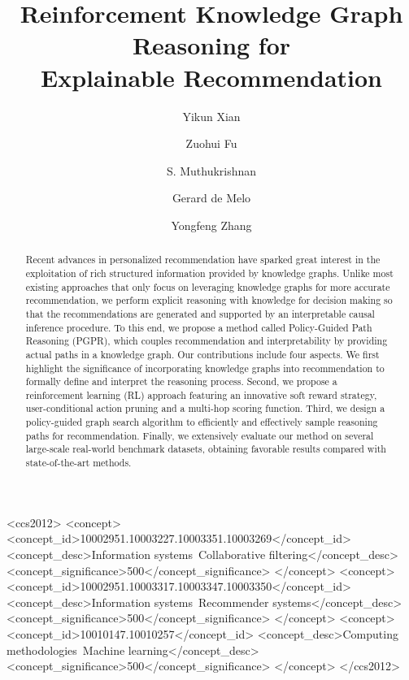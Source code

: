 \documentclass[sigconf]{acmart}
\begin{document}
\fancyhead{}

\title{Reinforcement Knowledge Graph Reasoning for \\ Explainable Recommendation}

\author{Yikun Xian}

\author{Zuohui Fu}
\authornotemark[1]

\author{S. Muthukrishnan}

\author{Gerard de Melo}

\author{Yongfeng Zhang}


\begin{abstract}
Recent advances in personalized recommendation have sparked great interest in the exploitation of rich structured information provided by knowledge graphs.
Unlike most existing approaches that only focus on leveraging knowledge graphs for more accurate recommendation, we perform explicit reasoning with knowledge for decision making so that the recommendations are generated and supported by an interpretable causal inference procedure.
To this end, we propose a method called Policy-Guided Path Reasoning (PGPR), which couples recommendation and interpretability by providing actual paths in a knowledge graph. Our contributions include four aspects. We first highlight the significance of incorporating knowledge graphs into recommendation to formally define and interpret the reasoning process. Second, we propose a reinforcement learning (RL) approach featuring an innovative soft reward strategy, user-conditional action pruning and a multi-hop scoring function. Third, we design a policy-guided graph search algorithm to efficiently and effectively sample reasoning paths for recommendation. Finally, we extensively evaluate our method on several large-scale real-world benchmark datasets, obtaining favorable results compared with state-of-the-art methods.
\end{abstract}

\begin{CCSXML}
<ccs2012>
<concept>
<concept_id>10002951.10003227.10003351.10003269</concept_id>
<concept_desc>Information systems~Collaborative filtering</concept_desc>
<concept_significance>500</concept_significance>
</concept>
<concept>
<concept_id>10002951.10003317.10003347.10003350</concept_id>
<concept_desc>Information systems~Recommender systems</concept_desc>
<concept_significance>500</concept_significance>
</concept>
<concept>
<concept_id>10010147.10010257</concept_id>
<concept_desc>Computing methodologies~Machine learning</concept_desc>
<concept_significance>500</concept_significance>
</concept>
</ccs2012>
\end{CCSXML}
\end{document}
